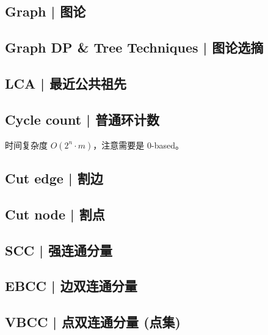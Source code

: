 \documentclass[8pt,a4paper]{article}
\newcommand{\code}[1]{
    
}
\newcommand{\txt}[1]{\par\noindent\footnotesize #1}
\begin{document}
\begin{multicols}{2}
        \code{src/data_structure/pbds_tree.cpp}

\section{Graph | 图论}

    \subsection{Graph DP \& Tree Techniques | 图论选摘}
        

    \subsection{LCA | 最近公共祖先}
        \code{src/graph/lca.cpp}
    
    \subsection{Cycle count | 普通环计数}
        \txt{时间复杂度 $O(2^n \cdot m)$，注意需要是 0-based。}
        \code{src/graph/cycle_count.cpp}
    
    \subsection{Cut edge | 割边}
        \code{src/graph/tarjan_cut_edge.cpp}
    
    \subsection{Cut node | 割点}
        \code{src/graph/tarjan_cut_node.cpp}
    
    \subsection{SCC | 强连通分量}
        \code{src/graph/tarjan_scc.cpp}
    
    \subsection{EBCC | 边双连通分量}
        \code{src/graph/tarjan_ebcc.cpp}
    
    \subsection{VBCC | 点双连通分量 (点集)}
        \code{src/graph/tarjan_vbcc_node.cpp}
    

\end{multicols}
\end{document}
